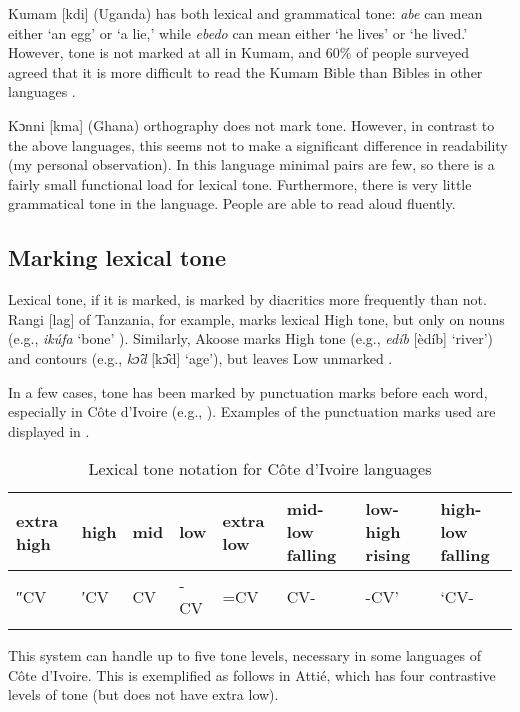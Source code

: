 \documentclass[output=paper]{langscibook}
\begin{document}
    Kumam [kdi] (Uganda) has both lexical and grammatical tone: \textit{abe} can mean either ‘an egg’ or ‘a lie,’ while \textit{ebedo} can mean either ‘he lives’ or ‘he lived.’ However, tone is not marked at all in Kumam, and 60\% of people surveyed agreed that it is more difficult to read the Kumam Bible than Bibles in other languages \citep{Edonyu2015}.

     Kɔnni [kma] (Ghana) orthography does not mark tone. However, in contrast to the above languages, this seems not to make a significant difference in readability (my personal observation). In this language minimal pairs are few, so there is a fairly small functional load for lexical tone. Furthermore, there is very little grammatical tone in the language. People are able to read aloud fluently.

  \subsection{Marking lexical tone} 
  \label{sec:HowToneMarked:MarkLexical:2}
    Lexical tone, if it is marked, is marked by diacritics more frequently than not. Rangi [lag] of Tanzania, for example, marks lexical High tone, but only on nouns (e.g., \textit{ikúfa} ‘bone’ \citep{Stegen2005}). Similarly, Akoose marks High tone (e.g., \textit{edíb} [èdíb] ‘river’) and contours (e.g., \textit{kɔ̂d}  [kɔ̂d] ‘age’), but leaves Low unmarked \citep[13]{Hedinger2011}.

    In a few cases, tone has been marked by punctuation marks before each word, especially in Côte d’Ivoire (e.g., \citealt{Bolli1978}). Examples of the punctuation marks used are displayed in .

    
    \begin{table}
      \begin{tabularx}{\textwidth}{XXXXXXXX}
      \lsptoprule
      extra high & high & mid & low & extra low & mid-low falling & low-high rising & high-low falling\\\midrule
      ″CV & ′CV & CV & {}-CV & =CV & CV- & {}-CV’ & ‘CV-\\
      \lspbottomrule
      \end{tabularx}
      \caption{Lexical tone notation for Côte d’Ivoire languages \citep[58]{Kutsch2014}\label{tab:cahill:LexicalToneNotationCoteLang:9}}
    \end{table}

    This system can handle up to five tone levels, necessary in some languages of Côte d’Ivoire. This is exemplified as follows in Attié, which has four contrastive levels of tone (but does not have extra low).
\end{document}

